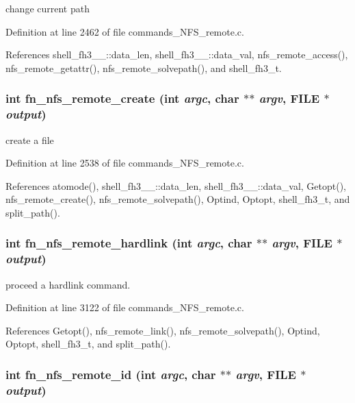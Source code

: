 change current path 

Definition at line 2462 of file commands\_\-NFS\_\-remote.c.

References shell\_\-fh3\_\-\_\-::data\_\-len, shell\_\-fh3\_\-\_\-::data\_\-val, nfs\_\-remote\_\-access(), nfs\_\-remote\_\-getattr(), nfs\_\-remote\_\-solvepath(), and shell\_\-fh3\_\-t.
\subsubsection{\setlength{\rightskip}{0pt plus 5cm}int fn\_\-nfs\_\-remote\_\-create (int {\em argc}, char $\ast$$\ast$ {\em argv}, FILE $\ast$ {\em output})}\label{commands__NFS__remote_8c_a62}


create a file 

Definition at line 2538 of file commands\_\-NFS\_\-remote.c.

References atomode(), shell\_\-fh3\_\-\_\-::data\_\-len, shell\_\-fh3\_\-\_\-::data\_\-val, Getopt(), nfs\_\-remote\_\-create(), nfs\_\-remote\_\-solvepath(), Optind, Optopt, shell\_\-fh3\_\-t, and split\_\-path().
\subsubsection{\setlength{\rightskip}{0pt plus 5cm}int fn\_\-nfs\_\-remote\_\-hardlink (int {\em argc}, char $\ast$$\ast$ {\em argv}, FILE $\ast$ {\em output})}\label{commands__NFS__remote_8c_a67}


proceed a hardlink command. 

Definition at line 3122 of file commands\_\-NFS\_\-remote.c.

References Getopt(), nfs\_\-remote\_\-link(), nfs\_\-remote\_\-solvepath(), Optind, Optopt, shell\_\-fh3\_\-t, and split\_\-path().
\subsubsection{\setlength{\rightskip}{0pt plus 5cm}int fn\_\-nfs\_\-remote\_\-id (int {\em argc}, char $\ast$$\ast$ {\em argv}, FILE $\ast$ {\em output})}\label{commands__NFS__remote_8c_a71}




